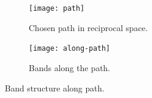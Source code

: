 \documentclass[11pt, english, fleqn, DIV=15, headinclude, BCOR=1cm]{scrartcl}
\begin{document}
\begin{figure}
    \begin{subfigure}[c]{0.48\linewidth}
    \centering
    \texttt{[image: path]}
    \caption{%
        Chosen path in reciprocal space.
    }
    \label{fig:along-path/1}
    \end{subfigure}
    \hfill
    \begin{subfigure}[c]{0.48\linewidth}
    \centering
    \texttt{[image: along-path]}
    \caption{%
        Bands along the path.
    }
    \label{fig:along-path/2}
    \end{subfigure}
    \caption{%
        Band structure along path.
    }
    \label{fig:along-path}
\end{figure}
\end{document}
